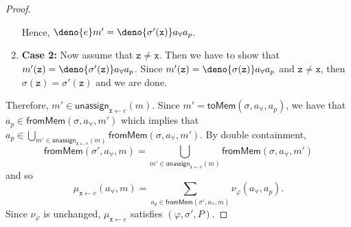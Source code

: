 \documentclass[acmsmall,review,anonymous]{acmart}\settopmatter{printfolios=true,printccs=false,printacmref=false}
\begin{document}
\begin{proof}
\begin{enumerate}
    Hence, $\deno{e}m' = \deno{\sigma'(\mathtt{x})}a_{\forall}a_p$.
  \item \textbf{Case 2:} Now assume that $\mathtt{z} \neq \mathtt{x}$. Then we have to show that $m'(\mathtt{z}) = \deno{\sigma'(\mathtt{z})}a_{\forall}a_p$. Since $m'(\mathtt{z}) = \deno{\sigma(\mathtt{z})}a_{\forall}a_p$ and $\mathtt{z}\neq\mathtt{x}$, then $\sigma(\mathtt{z}) = \sigma'(\mathtt{z})$ and we are done.
  \end{enumerate}
  Therefore, $m' \in \mathsf{unassign}_{\mathtt{x}\gets e}(m)$. Since $m' = \mathsf{toMem}(\sigma,a_{\forall},a_p)$, we have that $a_p \in \mathsf{fromMem}(\sigma,a_{\forall},m')$ which implies that $a_p \in  \bigcup_{m' \in \mathsf{unassign}_{\mathtt{x}\gets e}(m)} \mathsf{fromMem}(\sigma,a_{\forall},m')$. By double containment,
  \[
    \mathsf{fromMem}(\sigma',a_{\forall},m) = \bigcup_{m' \in \mathsf{unassign}_{\mathtt{x}\gets e}(m)} \mathsf{fromMem}(\sigma,a_{\forall},m')
  \]
  and so
  \[
    \mu_{\mathtt{x}\gets e}(a_{\forall},m) = \sum_{a_p \in \mathsf{fromMem}(\sigma',a_{\forall},m)} \nu_{\varphi}(a_{\forall},a_p).
  \]
  Since $\nu_{\varphi}$ is unchanged, $\mu_{\mathtt{x}\gets e}$ satisfies $(\varphi,\sigma',P)$.
\end{proof}
\end{document}
